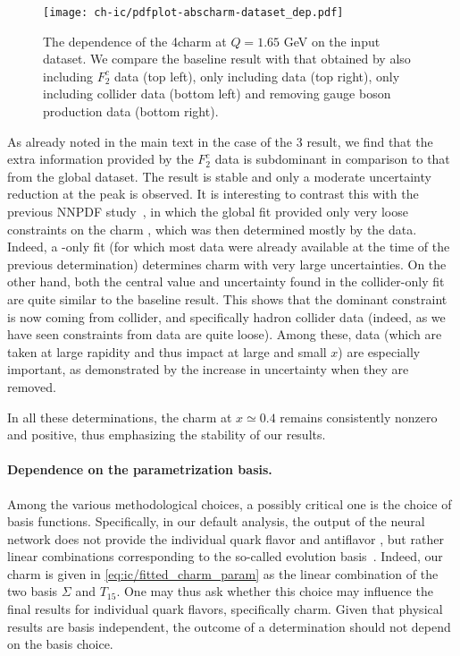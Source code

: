 \begin{figure}[t!]
  \begin{center}
    \texttt{[image: ch-ic/pdfplot-abscharm-dataset\_dep.pdf]}
    \caption{\small The dependence of the 4\fns charm \pdf at $Q=1.65$ GeV on
      the input dataset.
      We compare the
    baseline result with that obtained by also including 
      \emc $F_2^c$ data (top left), only including \dis data (top
    right), only including collider data (bottom left) and removing
    \lhcb gauge boson production data (bottom right). 
  \label{fig:ic/charm_dataset_dep} }
\end{center}
\end{figure}

As already noted in the main  text in the case of the 3\fns
result, we find that the extra information provided by the  \emc
$F_2^c$ data is subdominant in comparison to that from the global
dataset. The result is stable and only a moderate
uncertainty reduction at the peak is observed. It is interesting to
contrast this with the previous NNPDF study~\cite{Ball:2016neh}, in
which the global fit provided only very loose constraints on the charm
\pdf, which was then determined mostly by the \emc data.
%
Indeed, a \dis-only fit (for which most data were already available at the time
of the previous determination) determines charm with very large
uncertainties. On the other hand, both the central value and
uncertainty found in the collider-only fit are quite similar to the
baseline result.
%
This shows that the dominant constraint is now coming from
collider, and specifically hadron collider data (indeed, as we have
seen constraints from \dis data are quite loose). Among these, \lhcb
data (which are taken at large rapidity and thus impact \pdfs at large
and small $x$) are especially important, as demonstrated by the
increase in uncertainty when they are removed.

In all these determinations, the charm
\pdf at $x\simeq 0.4$ remains consistently nonzero and positive, thus
emphasizing the stability of our results.

\paragraph{Dependence on the parametrization basis.}
%
Among the various methodological choices, a possibly critical one is
the choice of basis functions. Specifically, in our default analysis,
the output of the neural network does not provide the individual
quark flavor and antiflavor \pdfs, but rather linear combinations
corresponding to the so-called evolution
basis~\cite{Ball:2021leu}. Indeed, our charm \pdf is given in
\cref{eq:ic/fitted_charm_param}  as the linear combination of the
two basis \pdfs $\Sigma$ and $T_{15}$.
One may thus ask whether this choice may influence the final results
for individual quark flavors, specifically charm.
Given that physical results are basis
independent, the outcome of a \pdf determination should not depend
on the basis choice.

